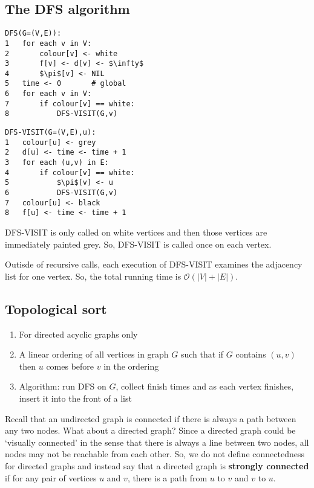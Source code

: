 \documentclass[11pt]{article}
\begin{document}
\subsection{The DFS algorithm}

\begin{lstlisting}
DFS(G=(V,E)):
1   for each v in V:
2       colour[v] <- white
3       f[v] <- d[v] <- $\infty$
4       $\pi$[v] <- NIL
5   time <- 0       # global
6   for each v in V: 
7       if colour[v] == white: 
8           DFS-VISIT(G,v) 
\end{lstlisting}
    
\begin{lstlisting}
DFS-VISIT(G=(V,E),u):
1   colour[u] <- grey
2   d[u] <- time <- time + 1
3   for each (u,v) in E: 
4       if colour[v] == white: 
5           $\pi$[v] <- u
6           DFS-VISIT(G,v)
7   colour[u] <- black 
8   f[u] <- time <- time + 1
\end{lstlisting}


DFS-VISIT is only called on white vertices and then those vertices are immediately painted grey. So, DFS-VISIT is called once on each vertex. 

Outisde of recursive calls, each execution of DFS-VISIT examines the adjacency list for one vertex. So, the total running time is $\mathcal{O}(|V| + |E|)$. 

\subsection{Topological sort}
\begin{enumerate}
    \item For directed acyclic graphs only
    \item A linear ordering of all vertices in graph $G$ such that if $G$ contains $(u,v)$ then $u$ comes before $v$ in the ordering
    \item Algorithm: run DFS on $G$, collect finish times and as each vertex finishes, insert it into the front of a list
\end{enumerate}

Recall that an undirected graph is connected if there is always a path between any two nodes. What about a directed graph? Since a directed graph could be `visually connected' in the sense that there is always a line between two nodes, all nodes may not be reachable from each other. So, we do not define connectedness for directed graphs and instead say that a directed graph is \textbf{strongly connected} if for any pair of vertices $u$ and $v$, there is a path from $u$ to $v$ and $v$ to $u$. 
\end{document}
